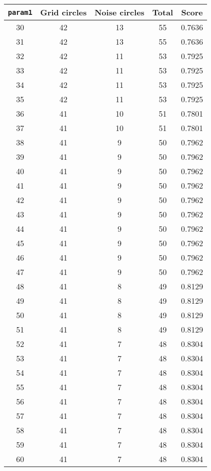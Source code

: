 \documentclass[letterpaper, 12pt]{article}
\begin{document}
\begin{longtable}{|c|c|c|c|c|}
\hline
\textbf{\texttt{param1}} & \textbf{Grid circles} & \textbf{Noise circles} & \textbf{Total} & \textbf{Score} \\
\hline
30 & 42 & 13 & 55 & 0.7636 \\
\hline
31 & 42 & 13 & 55 & 0.7636 \\
\hline
32 & 42 & 11 & 53 & 0.7925 \\
\hline
33 & 42 & 11 & 53 & 0.7925 \\
\hline
34 & 42 & 11 & 53 & 0.7925 \\
\hline
35 & 42 & 11 & 53 & 0.7925 \\
\hline
36 & 41 & 10 & 51 & 0.7801 \\
\hline
37 & 41 & 10 & 51 & 0.7801 \\
\hline
38 & 41 & 9 & 50 & 0.7962 \\
\hline
39 & 41 & 9 & 50 & 0.7962 \\
\hline
40 & 41 & 9 & 50 & 0.7962 \\
\hline
41 & 41 & 9 & 50 & 0.7962 \\
\hline
42 & 41 & 9 & 50 & 0.7962 \\
\hline
43 & 41 & 9 & 50 & 0.7962 \\
\hline
44 & 41 & 9 & 50 & 0.7962 \\
\hline
45 & 41 & 9 & 50 & 0.7962 \\
\hline
46 & 41 & 9 & 50 & 0.7962 \\
\hline
47 & 41 & 9 & 50 & 0.7962 \\
\hline
48 & 41 & 8 & 49 & 0.8129 \\
\hline
49 & 41 & 8 & 49 & 0.8129 \\
\hline
50 & 41 & 8 & 49 & 0.8129 \\
\hline
51 & 41 & 8 & 49 & 0.8129 \\
\hline
52 & 41 & 7 & 48 & 0.8304 \\
\hline
53 & 41 & 7 & 48 & 0.8304 \\
\hline
54 & 41 & 7 & 48 & 0.8304 \\
\hline
55 & 41 & 7 & 48 & 0.8304 \\
\hline
56 & 41 & 7 & 48 & 0.8304 \\
\hline
57 & 41 & 7 & 48 & 0.8304 \\
\hline
58 & 41 & 7 & 48 & 0.8304 \\
\hline
59 & 41 & 7 & 48 & 0.8304 \\
\hline
60 & 41 & 7 & 48 & 0.8304 \\
\hline

\end{longtable}
\end{document}
